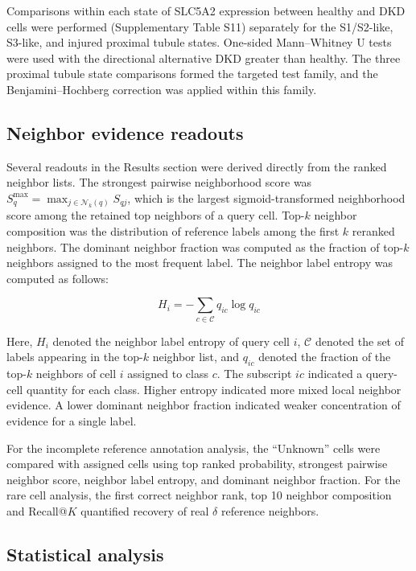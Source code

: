 \documentclass[11pt]{article}
\begin{document}
Comparisons within each state of SLC5A2 expression between healthy and DKD cells were performed (Supplementary Table S11) separately for the S1/S2-like, S3-like, and injured proximal tubule states. One-sided Mann--Whitney U tests were used with the directional alternative DKD greater than healthy. The three proximal tubule state comparisons formed the targeted test family, and the Benjamini--Hochberg correction was applied within this family.

\subsection*{Neighbor evidence readouts}

Several readouts in the Results section were derived directly from the ranked neighbor lists. The strongest pairwise neighborhood score was \(S_q^{\max}=\max_{j\in\mathcal{N}_k(q)}S_{qj}\), which is the largest sigmoid-transformed neighborhood score among the retained top neighbors of a query cell. Top-$k$ neighbor composition was the distribution of reference labels among the first $k$ reranked neighbors. The dominant neighbor fraction was computed as the fraction of top-$k$ neighbors assigned to the most frequent label. The neighbor label entropy was computed as follows:

\begin{equation}
H_i=
-
\sum_{c\in\mathcal{C}}
q_{ic}
\log q_{ic}
  \label{eq:H}
\end{equation}

Here, $H_i$ denoted the neighbor label entropy of query cell $i$, $\mathcal{C}$ denoted the set of labels appearing in the top-$k$ neighbor list, and $q_{ic}$ denoted the fraction of the top-$k$ neighbors of cell $i$ assigned to class $c$. The subscript $ic$ indicated a query-cell quantity for each class. Higher entropy indicated more mixed local neighbor evidence. A lower dominant neighbor fraction indicated weaker concentration of evidence for a single label.

For the incomplete reference annotation analysis, the ``Unknown'' cells were compared with assigned cells using top ranked probability, strongest pairwise neighbor score, neighbor label entropy, and dominant neighbor fraction. For the rare cell analysis, the first correct neighbor rank, top 10 neighbor composition and Recall@$K$ quantified recovery of real $\delta$ reference neighbors.

\subsection*{Statistical analysis}
\end{document}
